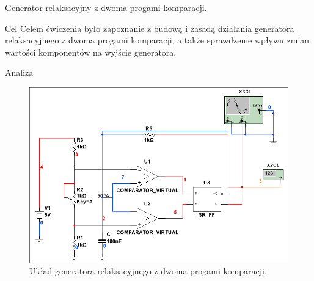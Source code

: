 \documentclass[a4paper]{scrartcl}
\begin{document}
	\begin{section}{Generator relaksacyjny z dwoma progami komparacji.}
		\begin{subsection}{Cel}
			Celem ćwiczenia było zapoznanie z budową i zasadą działania generatora relaksacyjnego z dwoma progami komparacji, a także sprawdzenie wpływu zmian wartości komponentów na wyjście generatora.
		\end{subsection}

		\begin{subsection}{Analiza}
				\begin{figure}[!ht]
				\begin{center}
					\includegraphics[width=0.7\linewidth,scale=2]{04-circuit}
					\caption{Układ generatora relaksacyjnego z dwoma progami komparacji.}
					\label{fig:04-circuit}
				\end{center}
				\end{figure}


\end{subsection}
\end{section}
\end{document}
